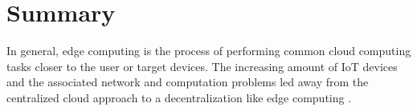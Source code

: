 \section{Summary}
In general, edge computing is the process of performing common cloud computing tasks closer to the user or target devices. The increasing amount of IoT devices and the associated network and computation problems led away from the centralized cloud approach to a decentralization like edge computing \cite{Shi2016a} \cite{Yu2017}.
